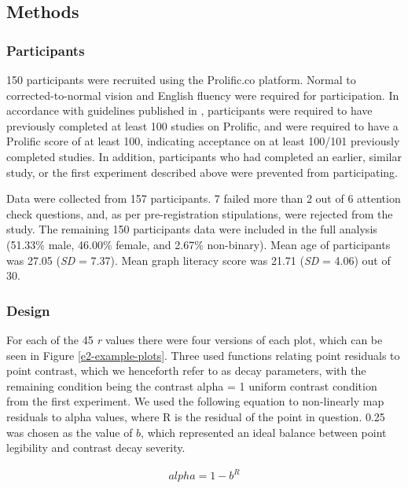\documentclass[preprint, 3p,
authoryear]{elsarticle} %
\begin{document}
\hypertarget{methods}{%
\subsection{Methods}\label{methods}}

\hypertarget{participants-1}{%
\subsubsection{Participants}\label{participants-1}}

150 participants were recruited using the Prolific.co platform. Normal
to corrected-to-normal vision and English fluency were required for
participation. In accordance with guidelines published in
\citep{peer_2021}, participants were required to have previously
completed at least 100 studies on Prolific, and were required to have a
Prolific score of at least 100, indicating acceptance on at least
100/101 previously completed studies. In addition, participants who had
completed an earlier, similar study, or the first experiment described
above were prevented from participating.

Data were collected from 157 participants. 7 failed more than 2 out of 6
attention check questions, and, as per pre-registration stipulations,
were rejected from the study. The remaining 150 participants data were
included in the full analysis (51.33\% male, 46.00\% female, and 2.67\%
non-binary). Mean age of participants was 27.05 (\emph{SD} = 7.37). Mean
graph literacy score was 21.71 (\emph{SD} = 4.06) out of 30.

\hypertarget{design-1}{%
\subsubsection{Design}\label{design-1}}

For each of the 45 \emph{r} values there were four versions of each
plot, which can be seen in Figure \ref{e2-example-plots}. Three used
functions relating point residuals to point contrast, which we
henceforth refer to as decay parameters, with the remaining condition
being the contrast alpha = 1 uniform contrast condition from the first
experiment. We used the following equation to non-linearly map residuals
to alpha values, where R is the residual of the point in question. 0.25
was chosen as the value of \(b\), which represented an ideal balance
between point legibility and contrast decay severity.

\begin{align}
  alpha = 1 - b^R
\end{align}
\end{document}

